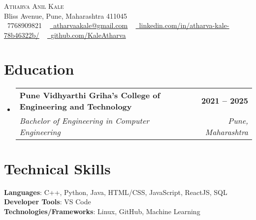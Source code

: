 \documentclass[letterpaper,11pt]{article}
\makeatletter
\newcommand{\resumeSubheading}[4]{
  \vspace{-2pt}\item
    \begin{tabular*}{1.0\textwidth}[t]{l@{\extracolsep{\fill}}r}
      \textbf{#1} & \textbf{\small #2} \\
      \textit{\small#3} & \textit{\small #4} \\
    \end{tabular*}\vspace{-7pt}
}
\newcommand{\resumeSubHeadingListStart}{\begin{itemize}[leftmargin=0.0in, label={}]}
\newcommand{\resumeSubHeadingListEnd}{\end{itemize}}
\makeatother
\begin{document}

\begin{center}
    {\Huge \scshape Atharva Anil Kale} \\ \vspace{1pt}
    Bliss Avenue, Pune, Maharashtra 411045 \\ \vspace{1pt}
    \small \raisebox{-0.1\height}\faPhone\ 7768909821 ~ \href{mailto:atharvaakale@gmail.com}{\raisebox{-0.2\height}\faEnvelope\  \underline{atharvaakale@gmail.com}} ~ 
    \href{https://www.linkedin.com/in/atharva-kale-78b46322b/}{\raisebox{-0.2\height}\faLinkedin\ \underline{linkedin.com/in/atharva-kale-78b46322b/}}  ~
    \href{https://github.com/KaleAtharva}{\raisebox{-0.2\height}\faGithub\ \underline{github.com/KaleAtharva}}
    \vspace{-8pt}
\end{center}


\section{Education}
  \resumeSubHeadingListStart
    \resumeSubheading
      {Pune Vidhyarthi Griha's College of Engineering and Technology}{2021 -- 2025}
      {Bachelor of Engineering in Computer Engineering}{Pune, Maharashtra}
  \resumeSubHeadingListEnd

%
\section{Technical Skills}
 \begin{itemize}[leftmargin=0in, label={}]
    \small{\item{
     \textbf{Languages}{: C++, Python, Java, HTML/CSS, JavaScript, ReactJS, SQL} \\
     \textbf{Developer Tools}{: VS Code} \\
     \textbf{Technologies/Frameworks}{: Linux, GitHub, Machine Learning} \\
    }}
 \end{itemize}
 \vspace{-16pt}
\end{document}
